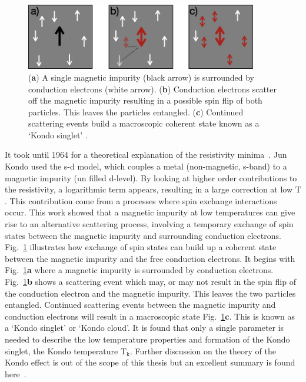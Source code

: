 \begin{figure}[!hbt]
 \begin{center}
  \includegraphics[width=0.9\textwidth]{figures/ch2/crop_FiguresMaster.009.png}
  \caption[Kondo effect illustration]{\label{fig:ch2/kondo_bulkdiagram} 
  (\textbf{a}) A single magnetic impurity (black arrow) is surrounded by conduction electrons (white arrow). (\textbf{b}) Conduction electrons scatter off the magnetic impurity resulting in a possible spin flip of both particles. This leaves the particles entangled. (\textbf{c}) Continued scattering events build a macroscopic coherent state known as a `Kondo singlet' .
   }
 \end{center}
\end{figure}


It took until 1964 for a theoretical explanation of the resistivity minima~\cite{jun_kondo}. Jun Kondo used the s-d model, which couples a metal (non-magnetic, s-band) to a magnetic impurity (un filled d-level). By looking at higher order contributions to the resistivity, a logarithmic term appears, resulting in a large correction at low $\mathrm{T}$. This contribution come from a processes where spin exchange interactions occur. This work showed that a magnetic impurity at low temperatures can give rise to an alternative scattering process, involving a temporary exchange of spin states between the magnetic impurity and surrounding conduction electrons. Fig.~\ref{fig:ch2/kondo_bulkdiagram} illustrates how exchange of spin states can build up a coherent state between the magnetic impurity and the free conduction electrons. It begins with Fig.~\ref{fig:ch2/kondo_bulkdiagram}\textbf{a} where a magnetic impurity is surrounded by conduction electrons. 
Fig.~\ref{fig:ch2/kondo_bulkdiagram}\textbf{b} shows a scattering event which may, or may not result in the spin flip of the conduction electron and the magnetic impurity. This leaves the two particles entangled. Continued scattering events between the magnetic impurity and conduction electrons will result in a macroscopic state Fig.~\ref{fig:ch2/kondo_bulkdiagram}\textbf{c}. This is known as a `Kondo singlet' or `Kondo cloud'. It is found that only a single parameter is needed to describe the low temperature properties and formation of the Kondo singlet, the Kondo temperature $\mathrm{T_k}$. Further discussion on the theory of the Kondo effect is out of the scope of this thesis but an excellent summary is found here~\cite{kondo_theory_history}. 




